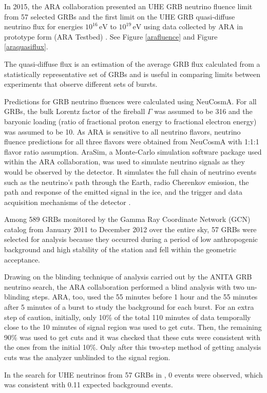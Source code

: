 \documentclass[12pt]{article}
\begin{document}
\begin{doublespace}
In 2015, the ARA collaboration presented an UHE GRB neutrino fluence limit from 57 selected GRBs and the first limit on the UHE GRB quasi-diffuse neutrino flux for energies $10^{16} \, \mathrm{ eV}$ to $10^{19} \, \mathrm{ eV}$ \cite{araproto} using data collected by ARA in prototype form (ARA Testbed) \cite{arahardware}. See Figure \ref{arafluence} and Figure \ref{araquasiflux}. \par
The quasi-diffuse flux is an estimation of the average GRB flux calculated from a statistically representative set of GRBs and is useful in comparing limits between experiments that observe different sets of bursts. \par
Predictions for GRB neutrino fluences were calculated using NeuCosmA. For all GRBs, the bulk Lorentz factor of the fireball $\Gamma$ was assumed to be 316 and the baryonic loading (ratio of fractional proton energy to fractional electron energy) was assumed to be 10. As ARA is sensitive to all neutrino flavors, neutrino fluence predictions for all three flavors were obtained from NeuCosmA with 1:1:1 flavor ratio assumption. AraSim, a Monte-Carlo simulation software package used within the ARA collaboration, was used to simulate neutrino signals as they would be observed by the detector. It simulates the full chain of neutrino events such as the neutrino's path through the Earth, radio Cherenkov emission, the path and response of the emitted signal in the ice, and the trigger and data acquisition mechanisms of the detector \cite{araproto}. 
\par
Among 589 GRBs monitored by the Gamma Ray Coordinate Network (GCN) catalog from January 2011 to December 2012 over the entire sky, 57 GRBs were selected for analysis because they occurred during a period of low anthropogenic background and high stability of the station and fell within the geometric acceptance. \par
Drawing on the blinding technique of analysis carried out by the ANITA GRB neutrino search, the ARA collaboration performed a blind analysis with two un-blinding steps. ARA, too, used the 55 minutes before 1 hour and the 55 minutes after 5 minutes of a burst to study the background for each burst. For an extra step of caution, initially, only 10\% of the total 110 minutes of data temporally close to the 10 minutes of signal region was used to get cuts. Then, the remaining 90\% was used to get cuts and it was checked that these cuts were consistent with the ones from the initial 10\%. Only after this two-step method of getting analysis cuts was the analyzer unblinded to the signal region. \par
In the search for UHE neutrinos from 57 GRBs in \cite{araproto}, 0 events were observed, which was consistent with 0.11 expected background events.



\end{doublespace}
\end{document}
